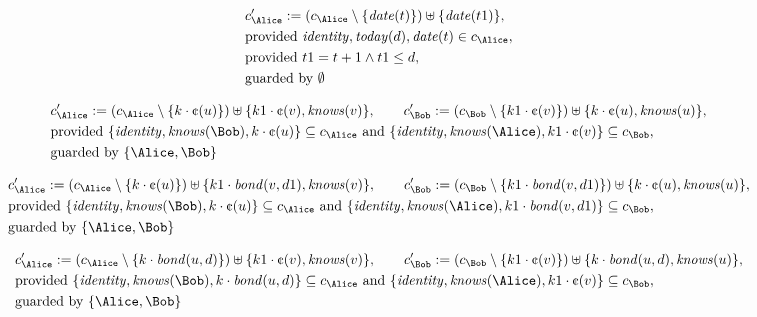 \begin{align*}
&
c'_
{
\Alice
}
 := 
(c_
{
\Alice
}
 \setminus 
\{
\mathit{
date
}
(
t
)
\}
) \uplus 
\{
\mathit{
date
}
(
t1
)
\}
,\\
&
\text{provided } 
\mathit{
identity
}
,
\mathit{
today
}
(
d
)
,
\mathit{
date
}
(
t
)
 \in c_
{
\Alice
}
,\\
&
\text{provided } 
t1
=
t
+ 1
\land
t1
\le
d
,\\
&
\text{guarded by } \emptyset
\end{align*}

\begin{align*}
&
c'_
{
\Alice
}
 := 
(c_
{
\Alice
}
 \setminus 
\{
k
\cdot
\text{\textcent}
(
u
)
\}
) \uplus 
\{
k1
\cdot
\text{\textcent}
(
v
)
,
\mathit{
knows
}
(
v
)
\}
, \qquad 
c'_
{
\Bob
}
 := 
(c_
{
\Bob
}
 \setminus 
\{
k1
\cdot
\text{\textcent}
(
v
)
\}
) \uplus 
\{
k
\cdot
\text{\textcent}
(
u
)
,
\mathit{
knows
}
(
u
)
\}
,\\
&
\text{provided } 
\{
\mathit{
identity
}
,
\mathit{
knows
}
(
\Bob
)
,
k
\cdot
\text{\textcent}
(
u
)
\}
 \subseteq c_
{
\Alice
}
 \text{ and } 
\{
\mathit{
identity
}
,
\mathit{
knows
}
(
\Alice
)
,
k1
\cdot
\text{\textcent}
(
v
)
\}
 \subseteq c_
{
\Bob
}
,\\
&
\text{guarded by } \{
\Alice
,
\Bob
\}
\end{align*}

\begin{align*}
&
c'_
{
\Alice
}
 := 
(c_
{
\Alice
}
 \setminus 
\{
k
\cdot
\text{\textcent}
(
u
)
\}
) \uplus 
\{
k1
\cdot
\mathit{
bond
}
(
v
,
d1
)
,
\mathit{
knows
}
(
v
)
\}
, \qquad 
c'_
{
\Bob
}
 := 
(c_
{
\Bob
}
 \setminus 
\{
k1
\cdot
\mathit{
bond
}
(
v
,
d1
)
\}
) \uplus 
\{
k
\cdot
\text{\textcent}
(
u
)
,
\mathit{
knows
}
(
u
)
\}
,\\
&
\text{provided } 
\{
\mathit{
identity
}
,
\mathit{
knows
}
(
\Bob
)
,
k
\cdot
\text{\textcent}
(
u
)
\}
 \subseteq c_
{
\Alice
}
 \text{ and } 
\{
\mathit{
identity
}
,
\mathit{
knows
}
(
\Alice
)
,
k1
\cdot
\mathit{
bond
}
(
v
,
d1
)
\}
 \subseteq c_
{
\Bob
}
,\\
&
\text{guarded by } \{
\Alice
,
\Bob
\}
\end{align*}

\begin{align*}
&
c'_
{
\Alice
}
 := 
(c_
{
\Alice
}
 \setminus 
\{
k
\cdot
\mathit{
bond
}
(
u
,
d
)
\}
) \uplus 
\{
k1
\cdot
\text{\textcent}
(
v
)
,
\mathit{
knows
}
(
v
)
\}
, \qquad 
c'_
{
\Bob
}
 := 
(c_
{
\Bob
}
 \setminus 
\{
k1
\cdot
\text{\textcent}
(
v
)
\}
) \uplus 
\{
k
\cdot
\mathit{
bond
}
(
u
,
d
)
,
\mathit{
knows
}
(
u
)
\}
,\\
&
\text{provided } 
\{
\mathit{
identity
}
,
\mathit{
knows
}
(
\Bob
)
,
k
\cdot
\mathit{
bond
}
(
u
,
d
)
\}
 \subseteq c_
{
\Alice
}
 \text{ and } 
\{
\mathit{
identity
}
,
\mathit{
knows
}
(
\Alice
)
,
k1
\cdot
\text{\textcent}
(
v
)
\}
 \subseteq c_
{
\Bob
}
,\\
&
\text{guarded by } \{
\Alice
,
\Bob
\}
\end{align*}
